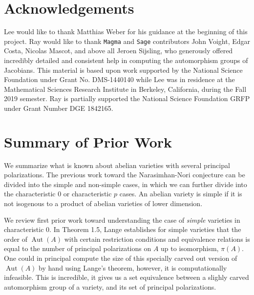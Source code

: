 \documentclass[12pt,reqno]{amsart}
\DeclareMathOperator{\Aut}{Aut}
\theoremstyle{definition}
\theoremstyle{remark}
\newtheorem*{remark}{Remark}
\begin{document}
\section*{Acknowledgements} 
Lee would like to thank Matthias Weber for his guidance at the beginning of this project. Ray would like to thank \texttt{Magma} and \texttt{Sage} contributors John Voight, Edgar Costa, Nicolas Mascot, and above all Jeroen Sijsling, who generously offered incredibly detailed and consistent help in computing the automorphism groups of Jacobians.  This material is based upon work supported by the National Science Foundation under Grant No. DMS-1440140 while Lee was in residence at the Mathematical Sciences Research Institute in Berkeley, California, during the Fall 2019 semester. Ray is partially supported the National Science Foundation GRFP under Grant Number DGE 1842165.

\section{Summary of Prior Work}

We summarize what is known about abelian varieties with several principal polarizations. The previous work toward the Narasimhan-Nori conjecture can be divided into the simple and non-simple cases, in which we can further divide into the characteristic 0 or characteristic $p$ cases. An abelian variety is simple if it is not isogenous to a product of abelian varieties of lower dimension. 

We review first prior work toward understanding the case of \textit{simple} varieties in characteristic 0. In \cite{several} Theorem 1.5, Lange establishes for simple varieties that the order of $\Aut(A)$ with certain restriction conditions and equivalence relations is equal to the number of principal polarizations on $A$ up to isomorphism, $\pi(A)$. One could in principal compute the size of this specially carved out version of $\Aut(A)$ by hand using Lange's theorem, however, it is computationally infeasible. This is incredible, it gives us a set equivalence between a slighly carved automorphism group of a variety, and its set of principal polarizations.

\end{document}
